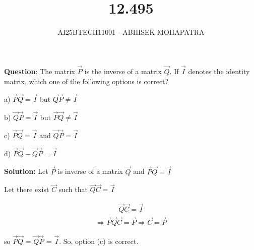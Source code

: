 \documentclass[journal,12pt,onecolumn]{IEEEtran}
\begin{document}
\title{12.495}
\author{AI25BTECH11001 - ABHISEK MOHAPATRA}
{\let\newpage\relax\maketitle}
	
	 	\textbf{Question}:
The matrix $\vec{P}$ is the inverse of a matrix $\vec{Q}$. If $\vec{I}$ denotes the identity matrix, which one of the following options is correct?

a) $\vec{P}\vec{Q} = \vec{I}$ but $\vec{Q}\vec{P} \neq \vec{I}$

b) $\vec{Q}\vec{P} = \vec{I}$ but $\vec{P}\vec{Q} \neq \vec{I}$

c) $\vec{P}\vec{Q} = \vec{I}$ and $\vec{Q}\vec{P} = \vec{I}$

d) $\vec{P}\vec{Q} - \vec{Q}\vec{P} = \vec{I}$

		\textbf{Solution:}
Let $\vec{P}$ is inverse of a matrix $\vec{Q}$ and $\vec{P}\vec{Q} = \vec{I}$

Let there exist $\vec{C}$ such that $\vec{Q}\vec{C} = \vec{I}$

\begin{align}
		\vec{Q}\vec{C} = \vec{I}
\end{align}
\begin{align}
		\Rightarrow \vec{P}\vec{Q}\vec{C} = \vec{P} \Rightarrow \vec{C} = \vec{P}
\end{align}

so $\vec{P}$$\vec{Q}$ = $\vec{Q}$$\vec{P}$ = $\vec{I}$.
So, option (c) is correct.
\end{document}
